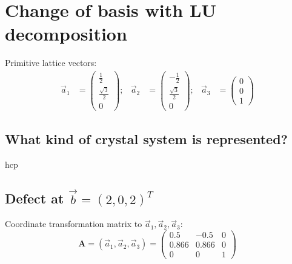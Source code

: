\section{Change of basis with LU decomposition}

Primitive lattice vectors:
\begin{align}
    \vec{a}_1 &= 
    \begin{pmatrix}
        \frac{1}{2} \\[2pt] \frac{\sqrt{3}}{2} \\[2pt] 0
    \end{pmatrix};
    &
    \vec{a}_2 &=
    \begin{pmatrix}
        -\frac{1}{2} \\[2pt] \frac{\sqrt{3}}{2} \\[2pt] 0
    \end{pmatrix};
    &
    \vec{a}_3 &=
    \begin{pmatrix}
        0 \\
        0 \\
        1
    \end{pmatrix}
\end{align}

\renewcommand\thesubsection{\thesection.\alph{subsection})}

\subsection{What kind of crystal system is represented?}

hcp

\subsection{Defect at $\vec{b} = (2,0,2)^T$}

Coordinate transformation matrix to ${\vec{a}_1,\vec{a}_2,\vec{a}_3}$:
\begin{equation}
    \symbf{A} = (\vec{a}_1,\vec{a}_2,\vec{a}_3) =
    \begin{pmatrix}
        0.5 & -0.5 & 0 \\
        0.866 & 0.866 & 0 \\
        0 & 0 & 1
    \end{pmatrix}
\end{equation}

